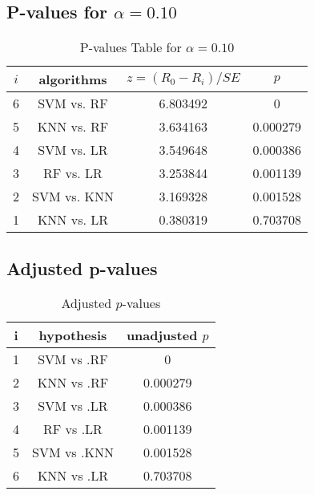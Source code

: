\documentclass[a4paper,10pt]{article}
\begin{document}
\begin{landscape}
\subsection{P-values for $\alpha=0.10$}

\begin{table}[!htp]
\centering\scriptsize
\begin{tabular}{cccc}
$i$&algorithms&$z=(R_0 - R_i)/SE$&$p$\\
\hline6&SVM vs. RF&6.803492&0\\
5&KNN vs. RF&3.634163&0.000279\\
4&SVM vs. LR&3.549648&0.000386\\
3&RF vs. LR&3.253844&0.001139\\
2&SVM vs. KNN&3.169328&0.001528\\
1&KNN vs. LR&0.380319&0.703708\\
\hline
\end{tabular}
\caption{P-values Table for $\alpha=0.10$}
\end{table}\pagebreak

\subsection{Adjusted p-values}

\begin{table}[!htp]
\centering\scriptsize
\begin{tabular}{ccc}
i&hypothesis&unadjusted $p$\\
\hline1&SVM vs .RF&0\\
2&KNN vs .RF&0.000279\\
3&SVM vs .LR&0.000386\\
4&RF vs .LR&0.001139\\
5&SVM vs .KNN&0.001528\\
6&KNN vs .LR&0.703708\\
\hline
\end{tabular}
\caption{Adjusted $p$-values}
\end{table}

\end{landscape}
\end{document}
